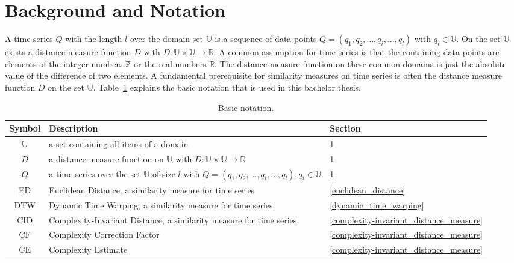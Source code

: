 \section{Background and Notation} \label{background_and_notation}
A time series $Q$ with the length $l$ over the domain set $\mathbb{U}$ is a sequence of data points
$Q = (q_1, q_2, \dots, q_i, \dots, q_l)$ with $q_i \in \mathbb{U}$. On the set $\mathbb{U}$ exists a distance measure
function $D$ with $D: \mathbb{U} \times \mathbb{U} \to \mathbb{R}$. A common assumption for time series is that the
containing data points are elements of the integer numbers $\mathbb{Z}$ or the real numbers $\mathbb{R}$. The distance
measure function on these common domains is just the absolute value of the difference of two elements. A fundamental
prerequisite for similarity measures on time series is often the distance measure function $D$ on the set
$\mathbb{U}$. Table~\ref{tab:notation} explains the basic notation that is used in this bachelor thesis.

\begin{table}[H]
    \begin{center}
        \begin{tabularx}{\textwidth}{c X l}
            \textbf{Symbol} \qquad & \textbf{Description} & \qquad \textbf{Section}\\
            \hline
            $\mathbb{U}$ & a set containing all items of a domain & \qquad \ref{background_and_notation}\\
            $D$ & a distance measure function on $\mathbb{U}$ with $D: \mathbb{U} \times \mathbb{U} \to \mathbb{R}$
                & \qquad \ref{background_and_notation}\\
            $Q$ & a time series over the set $\mathbb{U}$ of size $l$ with
                $Q = (q_1, q_2, \dots, q_i, \dots, q_l), q_i \in \mathbb{U}$ & \qquad \ref{background_and_notation}\\
            ED & Euclidean Distance, a similarity measure for time series & \qquad \ref{euclidean_distance}\\
            DTW & Dynamic Time Warping, a similarity measure for time series & \qquad \ref{dynamic_time_warping}\\
            CID & Complexity-Invariant Distance, a similarity measure for time series
                & \qquad \ref{complexity-invariant_distance_measure}\\
            CF & Complexity Correction Factor & \qquad \ref{complexity-invariant_distance_measure}\\
            CE & Complexity Estimate & \qquad \ref{complexity-invariant_distance_measure}\\
        \end{tabularx}
    \end{center}
    \caption{Basic notation.}
	\label{tab:notation}
\end{table}




